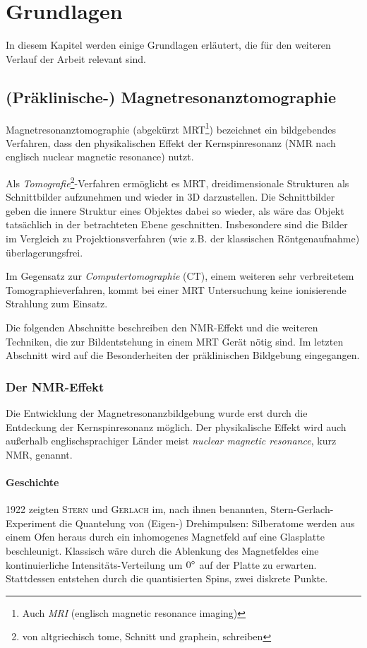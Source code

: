 \chapter{Grundlagen}
In diesem Kapitel werden einige Grundlagen erläutert, die für den weiteren Verlauf der Arbeit relevant sind.

\section{(Präklinische-) Magnetresonanztomographie}
Magnetresonanztomographie (abgekürzt MRT\footnote{Auch \textit{MRI} (englisch magnetic resonance imaging)}) bezeichnet ein bildgebendes Verfahren, dass den physikalischen Effekt der Kernspinresonanz (NMR nach englisch nuclear magnetic resonance) nutzt.

Als \textit{Tomografie}\footnote{von altgriechisch tome, Schnitt und graphein, schreiben}-Verfahren ermöglicht es MRT, dreidimensionale Strukturen als Schnittbilder aufzunehmen und wieder in 3D darzustellen. Die Schnittbilder geben die innere Struktur eines Objektes dabei so wieder, als wäre das Objekt tatsächlich in der betrachteten Ebene geschnitten. Insbesondere sind die Bilder im Vergleich zu Projektionsverfahren (wie z.B. der klassischen Röntgenaufnahme) überlagerungsfrei.

Im Gegensatz zur \textit{Computertomographie} (CT), einem weiteren sehr verbreitetem Tomographieverfahren, kommt bei einer MRT Untersuchung keine ionisierende Strahlung zum Einsatz.

Die folgenden Abschnitte beschreiben den NMR-Effekt und die weiteren Techniken, die zur Bildentstehung in einem MRT Gerät nötig sind. Im letzten Abschnitt wird auf die Besonderheiten der präklinischen Bildgebung eingegangen.

\subsection{Der NMR-Effekt}
Die Entwicklung der Magnetresonanzbildgebung wurde erst durch die Entdeckung der Kernspinresonanz möglich. Der physikalische Effekt wird auch außerhalb englischsprachiger Länder meist \textit{nuclear magnetic resonance}, kurz NMR, genannt.

\subsubsection{Geschichte}
1922 zeigten \textsc{Stern} und \textsc{Gerlach} im, nach ihnen benannten, Stern-Gerlach-Experiment die Quantelung von (Eigen-) Drehimpulsen: Silberatome werden aus einem Ofen heraus durch ein inhomogenes Magnetfeld auf eine Glasplatte beschleunigt. Klassisch wäre durch die Ablenkung des Magnetfeldes eine kontinuierliche Intensitäts-Verteilung um $0\degree$ auf der Platte zu erwarten. Stattdessen entstehen durch die quantisierten Spins, zwei diskrete Punkte. \cite{Gerlach1922}

